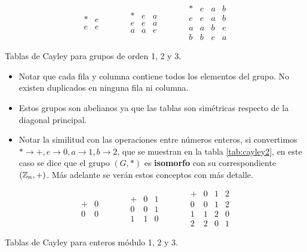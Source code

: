\begin{table}[H]
	\centering
	\[ \begin{array}{c|c}
		* & e \\ \hline
		e & e
	\end{array} \qquad \quad \begin{array}{c|cc}
		* & e & a \\ \hline
		e & e & a \\
		a & a & e
	\end{array} \qquad \quad \begin{array}{c|ccc}
		* & e & a & b \\ \hline
		e & e & a & b \\
		a & a & b & e \\
		b & b & e & a
	\end{array}\]
	\caption{Tablas de Cayley para grupos de orden 1, 2 y 3.}
	\label{tab:cayley}
\end{table}
\begin{itemize}
	\item Notar que cada fila y columna contiene todos los elementos del grupo. No existen duplicados en ninguna fila ni columna.
	
	\item Estos grupos son abelianos ya que las tablas son simétricas respecto de la diagonal principal.
	\item Notar la similitud con las operaciones entre números enteros, si convertimos $* \rightarrow +, e \rightarrow 0, a \rightarrow 1, b \rightarrow 2$, que se muestran en la tabla \ref{tab:cayley2}, en este caso se dice que el grupo $(G, *)$ es \textbf{isomorfo} con su correspondiente $(\mathbb{Z}_n, +)$. Más adelante se verán estos conceptos con más detalle.
\end{itemize}

\begin{table}[H]
	\centering
	\[ \begin{array}{c|c}
		+ & 0 \\ \hline
		0 & 0
	\end{array} \qquad \quad \begin{array}{c|cc}
		+ & 0 & 1 \\ \hline
		0 & 0 & 1 \\
		1 & 1 & 0
	\end{array} \qquad \quad \begin{array}{c|ccc}
		+ & 0 & 1 & 2 \\ \hline
		0 & 0 & 1 & 2 \\
		1 & 1 & 2 & 0 \\
		2 & 2 & 0 & 1
	\end{array}\]
	\caption{Tablas de Cayley para enteros módulo 1, 2 y 3.}
	\label{tab:cayley2}
\end{table}

